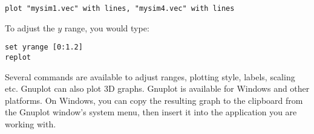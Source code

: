 \begin{verbatim}
plot "mysim1.vec" with lines, "mysim4.vec" with lines
\end{verbatim}

To adjust the $y$ range, you would type:

\begin{verbatim}
set yrange [0:1.2]
replot
\end{verbatim}

Several commands are available to adjust ranges, plotting style, labels,
scaling etc. Gnuplot can also plot 3D graphs. Gnuplot
is available for Windows and other platforms.
On Windows, you can copy the resulting graph to the clipboard from
the Gnuplot window's system menu, then insert it into the application you
are working with.



